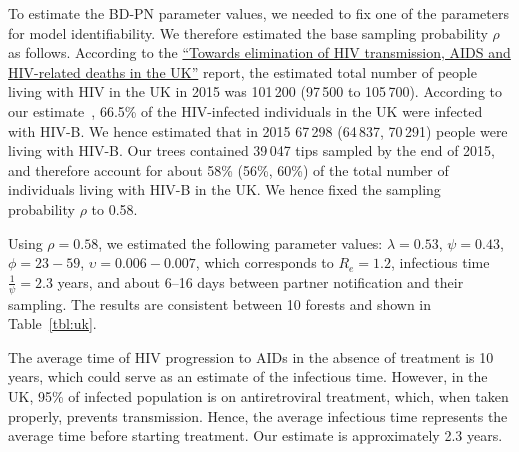 \documentclass[a4paper,10pt]{article}
\begin{document}
To estimate the BD-PN parameter values, we needed to fix one of the parameters for model identifiability. We therefore estimated the base sampling probability $\rho$ as follows. According to the \href{https://webarchive.nationalarchives.gov.uk/ukgwa/20181112132123mp_/https://assets.publishing.service.gov.uk/government/uploads/system/uploads/attachment_data/file/602942/HIV_in_the_UK_report.pdf}{``Towards elimination of HIV transmission, AIDS and HIV-related deaths in the UK''}
 report, the estimated total number of people living with HIV in the UK in 2015 was 101\,200 (97\,500 to 105\,700). %
According to our estimate~\citep{zhukovaModelingDrugResistance2023}, 66.5\% of the HIV-infected individuals in the UK were infected with HIV-B. We hence estimated that in 2015 67\,298 (64\,837, 70\,291) people were living with HIV-B. Our trees contained 39\,047 tips sampled by the end of 2015, and therefore account for about 58\% (56\%, 60\%) of the total number of individuals living with HIV-B in the UK. We hence fixed the sampling probability $\rho$ to 0.58. %
 
 
Using $\rho=0.58$, we estimated the following parameter values: $\lambda=0.53$, $\psi=0.43$, $\phi=23-59$, $\upsilon=0.006-0.007$, which corresponds to $R_e = 1.2$, infectious time $\frac{1}{\psi} = 2.3$ years, and about 6--16 days between partner notification and their sampling. The results are consistent between 10 forests and shown in Table~\ref{tbl:uk}. %
 
The average time of HIV progression to AIDs in the absence of treatment is 10 years, which could serve as an estimate of the infectious time. However, in the UK, 95\% of infected population is on antiretroviral treatment, which, when taken properly, prevents transmission. Hence, the average infectious time represents the average time before starting treatment. Our estimate is approximately 2.3 years. 
\end{document}
